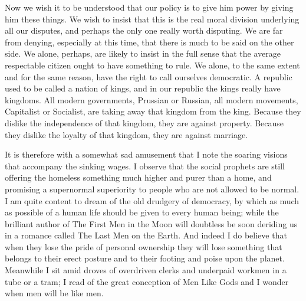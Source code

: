 \documentclass{book}
\begin{document}
Now we wish it to be understood that our policy is to give him power by giving him these things. We wish to insist that this is the real moral division underlying all our disputes, and perhaps the only one really worth disputing. We are far from denying, especially at this time, that there is much to be said on the other side. We alone, perhaps, are likely to insist in the full sense that the average respectable citizen ought to have something to rule. We alone, to the same extent and for the same reason, have the right to call ourselves democratic. A republic used to be called a nation of kings, and in our republic the kings really have kingdoms. All modern governments, Prussian or Russian, all modern movements, Capitalist or Socialist, are taking away that kingdom from the king. Because they dislike the independence of that kingdom, they are against property. Because they dislike the loyalty of that kingdom, they are against marriage.

It is therefore with a somewhat sad amusement that I note the soaring visions that accompany the sinking wages. I observe that the social prophets are still offering the homeless something much higher and purer than a home, and promising a supernormal superiority to people who are not allowed to be normal. I am quite content to dream of the old drudgery of democracy, by which as much as possible of a human life should be given to every human being; while the brilliant author of The First Men in the Moon will doubtless be soon deriding us in a romance called The Last Men on the Earth. And indeed I do believe that when they lose the pride of personal ownership they will lose something that belongs to their erect posture and to their footing and poise upon the planet. Meanwhile I sit amid droves of overdriven clerks and underpaid workmen in a tube or a tram; I read of the great conception of Men Like Gods and I wonder when men will be like men.
\end{document}
